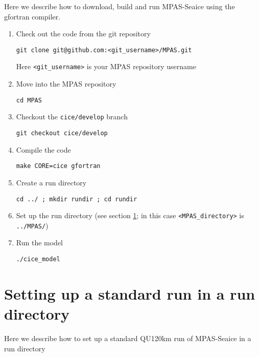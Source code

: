 \documentclass{article}
\begin{document}
Here we describe how to download, build and run MPAS-Seaice using the gfortran compiler.

\begin{enumerate}

\item Check out the code from the git repository

\verb+git clone git@github.com:<git_username>/MPAS.git+

Here \verb+<git_username>+ is your MPAS repository username

\item Move into the MPAS repository

\verb+cd MPAS+

\item Checkout the \verb+cice/develop+ branch

\verb+git checkout cice/develop+

\item Compile the code

\verb+make CORE=cice gfortran+

\item Create a run directory

\verb+cd ../ ; mkdir rundir ; cd rundir+

\item Set up the run directory (see section \ref{sec:standard_run}; in this case \verb+<MPAS_directory>+ is \verb+../MPAS/+) 

\item Run the model

\verb+./cice_model+

\end{enumerate}


\section{Setting up a standard run in a run directory}
\label{sec:standard_run}

Here we describe how to set up a standard QU120km run of MPAS-Seaice in a run directory
\end{document}

